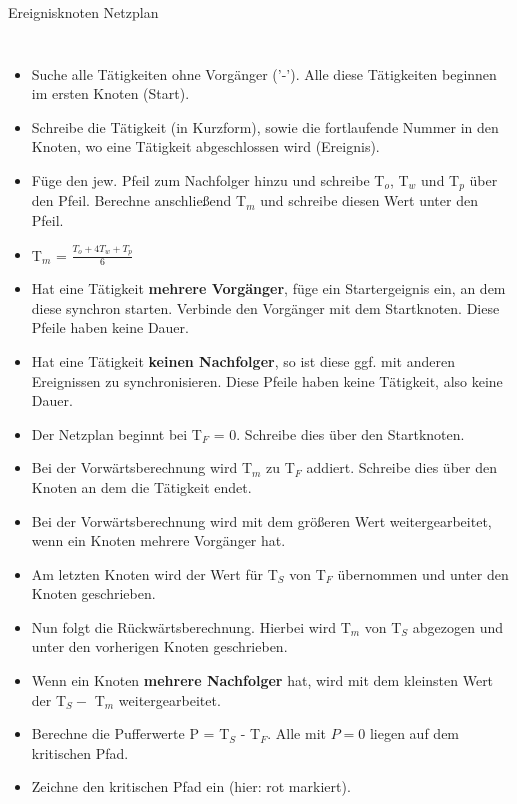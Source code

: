 \documentclass{beamer}
\begin{document}
\begin{frame}[t,shrink=65]{Ereignisknoten Netzplan}
\begin{columns}
{\begin{itemize}
      \item<only@1> Suche alle Tätigkeiten ohne Vorgänger ('-'). Alle diese Tätigkeiten beginnen im ersten Knoten (Start).

      \item<only@2-8> Schreibe die Tätigkeit (in Kurzform), sowie die fortlaufende Nummer in den Knoten, wo eine Tätigkeit abgeschlossen wird (Ereignis).

      \item<only@2-8> Füge den jew. Pfeil zum Nachfolger hinzu und schreibe T$_o$, T$_w$ und T$_p$ über den Pfeil. Berechne anschließend T$_m$ und schreibe diesen Wert unter den Pfeil.

      \item<only@2,4,6, 8> T$_m$ = $\frac{ T_{o} + 4T_{w} + T_{p}}{6}$

      \item<only@3,7> Hat eine Tätigkeit \textbf{mehrere Vorgänger}, füge ein Startergeignis ein, an dem diese synchron starten. Verbinde den Vorgänger mit dem Startknoten. Diese Pfeile haben keine Dauer.

      \item<only@5> Hat eine Tätigkeit \textbf{keinen Nachfolger}, so ist diese ggf. mit anderen Ereignissen zu synchronisieren. Diese Pfeile haben keine Tätigkeit, also keine Dauer.

      \item<only@9> Der Netzplan beginnt bei T$_F$ = 0. Schreibe dies über den Startknoten.

      \item<only@10-17> Bei der Vorwärtsberechnung wird T$_{m}$ zu T$_{F}$ addiert. Schreibe dies über den Knoten an dem die Tätigkeit endet.

      \item<only@11, 15> Bei der Vorwärtsberechnung wird mit dem größeren Wert weitergearbeitet, wenn ein Knoten mehrere Vorgänger hat.

      \item<only@17> Am letzten Knoten wird der Wert für T$_{S}$ von  T$_{F}$ übernommen und unter den Knoten geschrieben.

      \item<only@18-26> Nun folgt die Rückwärtsberechnung. Hierbei wird T$_{m}$ von T$_{S}$ abgezogen und unter den vorherigen Knoten geschrieben.

      \item<only@24,26> Wenn ein Knoten \textbf{mehrere Nachfolger} hat, wird mit dem kleinsten Wert der T$_{S} -$ T$_{m}$  weitergearbeitet.

      \item<only@27-> Berechne die Pufferwerte P = T$_{S}$ - T$_{F}$. Alle mit  $P=0$ liegen auf dem kritischen Pfad.

      \item<only@28> Zeichne den kritischen Pfad ein (hier: rot markiert).
    \end{itemize}
    }
  \end{columns}
\end{frame}
\end{document}
